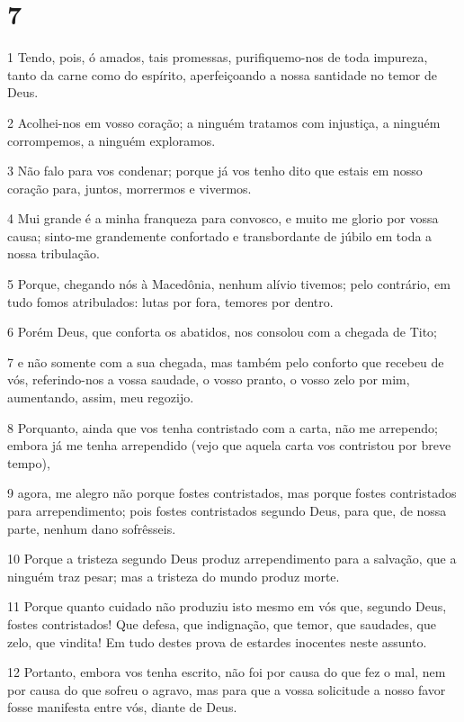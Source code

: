 \chapter{7}

\par 1 Tendo, pois, ó amados, tais promessas, purifiquemo-nos de toda impureza, tanto da carne como do espírito, aperfeiçoando a nossa santidade no temor de Deus.
\par 2 Acolhei-nos em vosso coração; a ninguém tratamos com injustiça, a ninguém corrompemos, a ninguém exploramos.
\par 3 Não falo para vos condenar; porque já vos tenho dito que estais em nosso coração para, juntos, morrermos e vivermos.
\par 4 Mui grande é a minha franqueza para convosco, e muito me glorio por vossa causa; sinto-me grandemente confortado e transbordante de júbilo em toda a nossa tribulação.
\par 5 Porque, chegando nós à Macedônia, nenhum alívio tivemos; pelo contrário, em tudo fomos atribulados: lutas por fora, temores por dentro.
\par 6 Porém Deus, que conforta os abatidos, nos consolou com a chegada de Tito;
\par 7 e não somente com a sua chegada, mas também pelo conforto que recebeu de vós, referindo-nos a vossa saudade, o vosso pranto, o vosso zelo por mim, aumentando, assim, meu regozijo.
\par 8 Porquanto, ainda que vos tenha contristado com a carta, não me arrependo; embora já me tenha arrependido (vejo que aquela carta vos contristou por breve tempo),
\par 9 agora, me alegro não porque fostes contristados, mas porque fostes contristados para arrependimento; pois fostes contristados segundo Deus, para que, de nossa parte, nenhum dano sofrêsseis.
\par 10 Porque a tristeza segundo Deus produz arrependimento para a salvação, que a ninguém traz pesar; mas a tristeza do mundo produz morte.
\par 11 Porque quanto cuidado não produziu isto mesmo em vós que, segundo Deus, fostes contristados! Que defesa, que indignação, que temor, que saudades, que zelo, que vindita! Em tudo destes prova de estardes inocentes neste assunto.
\par 12 Portanto, embora vos tenha escrito, não foi por causa do que fez o mal, nem por causa do que sofreu o agravo, mas para que a vossa solicitude a nosso favor fosse manifesta entre vós, diante de Deus.
